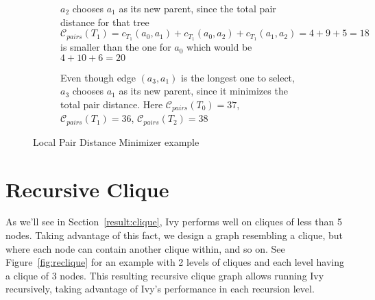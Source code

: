 \documentclass[a4paper, oneside]{discothesis}
\begin{document}
\begin{figure}[H]
\begin{subfigure}[t]{0.5\textwidth}
\centering
{}
\caption{$a_{2}$ chooses $a_{1}$ as its new parent, since the total pair distance for that tree $\mathcal{C}_{pairs}(T_1)=c_{T_1}(a_{0},a_{1})+c_{T_1}(a_{0},a_{2})+c_{T_1}(a_{1},a_{2})=4+9+5=18$ is smaller than the one for $a_{0}$ which would be $4+10+6=20$}
\end{subfigure}
\quad
\begin{subfigure}[t]{0.5\textwidth}
\centering
{}
\caption{Even though edge $(a_{3},a_{1})$ is the longest one to select, $a_{3}$ chooses $a_{1}$ as its new parent, since it minimizes the total pair distance. Here $\mathcal{C}_{pairs}(T_0)=37$, $\mathcal{C}_{pairs}(T_1)=36$, $\mathcal{C}_{pairs}(T_2)=38$}
\end{subfigure}
\caption{Local Pair Distance Minimizer example}
\label{fig:lpm}
\end{figure}

\section{Recursive Clique}

As we'll see in Section~\ref{result:clique}, Ivy performs well on cliques of less than 5 nodes. Taking advantage of this fact, we design a graph resembling a clique, but where each node can contain another clique within, and so on. See Figure~\ref{fig:reclique} for an example with 2 levels of cliques and each level having a clique of 3 nodes. This resulting recursive clique graph allows running Ivy recursively, taking advantage of Ivy's performance in each recursion level.
\end{document}
